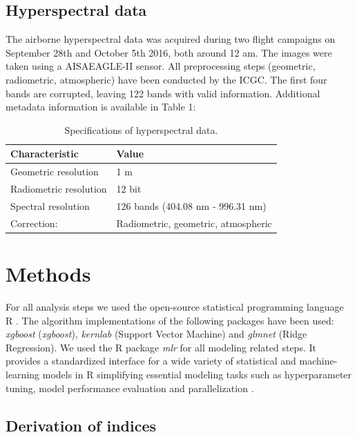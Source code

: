 \documentclass[review]{elsarticle}
\begin{document}
\subsection{Hyperspectral data}

The airborne hyperspectral data was acquired during two flight campaigns on September 28th and October 5th 2016, both around 12 am.
The images were taken using a AISAEAGLE-II sensor.
All preprocessing steps (geometric, radiometric, atmospheric) have been conducted by the \ac{ICGC}.
The first four bands are corrupted, leaving 122 bands with valid information.
Additional metadata information is available in Table 1:

\begin{table}[t!]
\centering
\caption[t]{Specifications of hyperspectral data.}
\begingroup\footnotesize
\begin{tabular}{ll}
	\\
	Characteristic         & Value                               \\
	\hline
	Geometric resolution   & 1 m                                 \\
	Radiometric resolution & 12 bit                              \\
	Spectral resolution    & 126 bands (404.08 nm - 996.31 nm)   \\
	Correction:            & Radiometric, geometric, atmospheric
\end{tabular}
\endgroup
\label{tab:hyperparameter_limits}
\end{table}

\section{Methods}

For all analysis steps we used the open-source statistical programming language R \citep{R_core}.
The algorithm implementations of the following packages have been used: \textit{xgboost} \citep{chenXGBoostScalableTree2016} (\textit{xgboost}), \textit{kernlab} \citep{kernlab} (Support Vector Machine) and \textit{glmnet} \citep{glmnet} (Ridge Regression).
We used the R package \textit{mlr} for all modeling related steps.
It provides a standardized interface for a wide variety of statistical and machine-learning models in R simplifying essential modeling tasks such as hyperparameter tuning, model performance evaluation and parallelization \citep{bischlMlrMachineLearning2016}.

\subsection{Derivation of indices}
\end{document}
